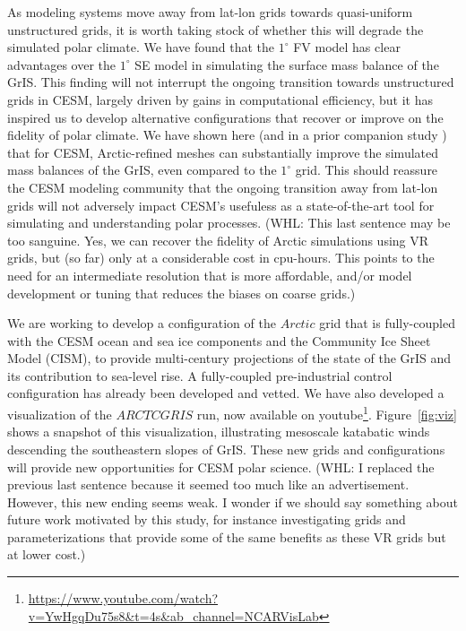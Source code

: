 \documentclass[draft]{agujournal2019}
\begin{document}
As modeling systems move away from lat-lon grids towards quasi-uniform unstructured grids, it is worth taking stock of whether this will degrade the simulated polar climate. We have found that the $1^{\circ}$ FV model has clear advantages over the $1^{\circ}$ SE model in simulating the surface mass balance of the GrIS. This finding will not interrupt the ongoing transition towards unstructured grids in CESM, largely driven by gains in computational efficiency, but it has inspired us to develop alternative configurations that recover or improve on the fidelity of polar climate. We have shown here (and in a prior companion study \cite{VETAL2018TC}) that for CESM, Arctic-refined meshes can substantially improve the simulated mass balances of the GrIS, even compared to the $1^{\circ}$ grid. This should reassure the CESM modeling community that the ongoing transition away from lat-lon grids will not adversely impact CESM's usefuless as a state-of-the-art tool for simulating and understanding polar processes.
{\color{blue} (WHL: This last sentence may be too sanguine.  Yes, we can recover the fidelity of Arctic simulations using VR grids, but (so far) only at a considerable cost in cpu-hours.  This points to the need for an intermediate resolution that is more affordable, and/or model development or tuning that reduces the biases on coarse grids.)}

We are  working to develop a configuration of the $Arctic$ grid that is fully-coupled with the CESM ocean and sea ice components and the Community Ice Sheet Model (CISM), to provide multi-century projections of the state of the GrIS and its contribution to sea-level rise. A fully-coupled pre-industrial control configuration has already been developed and vetted.
We have also developed a visualization of the $ARCTCGRIS$ run, now available on youtube\footnote{\url{https://www.youtube.com/watch?v=YwHgqDu75s8&t=4s&ab_channel=NCARVisLab}}.
Figure~\ref{fig:viz} shows a snapshot of this visualization, illustrating mesoscale katabatic winds descending the southeastern slopes of GrIS.
These new grids and configurations will provide new opportunities for CESM polar science.
{\color{blue} (WHL: I replaced the previous last sentence because it seemed too much like an advertisement.  However, this new ending seems weak.  I wonder if we should say something about future work motivated by this study, for instance investigating grids and parameterizations that provide some of the same benefits as these VR grids but at lower cost.)}
\end{document}
